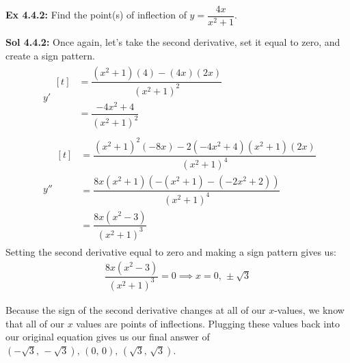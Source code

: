 \begin{tcolorbox}[example]
    \textbf{Ex 4.4.2: } Find the point(s) of inflection of $y = \dfrac{4x}{x^2 + 1}$.
\end{tcolorbox}
\begin{tcolorbox}[solution]
    \textbf{Sol 4.4.2: } Once again, let's take the second derivative, set it equal to zero, and create a sign pattern. \begin{align*}
        & y' \begin{aligned}[t]
            & = \dfrac{\left(x^2 + 1\right)(4) - (4x)(2x)}{\left(x^2 + 1\right)^2} \\[11pt]
            & = \dfrac{-4x^2 + 4}{\left(x^2 + 1\right)^2}
        \end{aligned} \\[11pt]
        & y'' \begin{aligned}[t]
            & = \dfrac{\left(x^2 + 1\right)^2(-8x) - 2\left(-4x^2 + 4\right)\left(x^2 + 1\right)(2x)}{\left(x^2 + 1\right)^4} \\[11pt]
            & = \dfrac{8x\left(x^2 + 1\right)\left(-\left(x^2 + 1\right) - \left(-2x^2 + 2\right)\right)}{\left(x^2 + 1\right)^4} \\[11pt]
            & = \dfrac{8x\left(x^2 - 3\right)}{\left(x^2 + 1\right)^3}
        \end{aligned}
    \end{align*}
    Setting the second derivative equal to zero and making a sign pattern gives us: \begin{align*}
        \dfrac{8x\left(x^2 - 3\right)}{\left(x^2 + 1\right)^3} = 0 \implies x = 0, \, \pm\sqrt{3}
    \end{align*} \begin{center}
    \end{center}
    Because the sign of the second derivative changes at all of our $x$-values, we know that all of our $x$ values are points of inflections. Plugging these values back into our original equation gives us our final answer of $\boxed{\left(-\sqrt{3}, \, -\sqrt{3}\right), \, (0, \, 0), \, \left(\sqrt{3}, \, \sqrt{3}\right)}$.
\end{tcolorbox} \vspace{11pt}

